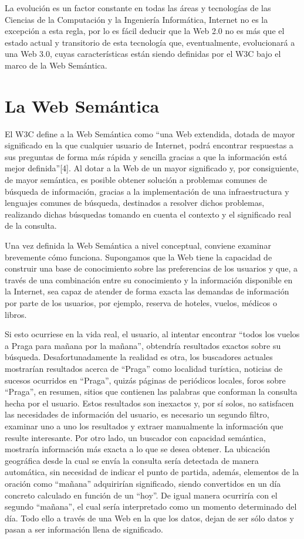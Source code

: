 La evolución es un factor constante en todas las áreas y tecnologías de las Ciencias de la Computación y la Ingeniería Informática, Internet no es la excepción a esta regla, por lo es fácil deducir que la Web 2.0 no es más que el estado actual y transitorio de esta tecnología que, eventualmente, evolucionará a una Web 3.0, cuyas características están siendo definidas por el W3C bajo el marco de la Web Semántica.

\section{La Web Semántica}

El W3C define a la Web Semántica como ``una Web extendida, dotada de mayor significado en la que cualquier usuario de Internet, podrá encontrar respuestas a sus preguntas de forma más rápida y sencilla gracias a que la información está mejor definida''[4]. Al dotar a la Web de un mayor significado y, por consiguiente, de mayor semántica, es posible obtener solución a problemas comunes de búsqueda de información, gracias a la implementación de una infraestructura y lenguajes comunes de búsqueda, destinados a resolver dichos problemas, realizando dichas búsquedas tomando en cuenta el contexto y el significado real de la consulta.

Una vez definida la Web Semántica a nivel conceptual, conviene examinar brevemente cómo funciona. Supongamos que la Web tiene la capacidad de construir una base de conocimiento sobre las preferencias de los usuarios y que, a través de una combinación entre su conocimiento y la información disponible en la Internet, sea capaz de atender de forma exacta las demandas de información por parte de los usuarios, por ejemplo, reserva de hoteles, vuelos, médicos o libros.

Si esto ocurriese en la vida real, el usuario, al intentar encontrar ``todos los vuelos a Praga para mañana por la mañana'', obtendría resultados exactos sobre su búsqueda. Desafortunadamente la realidad es otra, los buscadores actuales mostrarían resultados acerca de ``Praga'' como localidad turística, noticias de sucesos ocurridos en ``Praga'', quizás páginas de periódicos locales, foros sobre ``Praga'', en resumen, sitios que contienen las palabras que conforman la consulta hecha por el usuario. Estos resultados son inexactos y, por sí solos, no satisfacen las necesidades de información del usuario, es necesario un segundo filtro, examinar uno a uno los resultados y extraer manualmente la información que resulte interesante. Por otro lado, un buscador con capacidad semántica, mostraría información más exacta a lo que se desea obtener. La ubicación geográfica desde la cual se envía la consulta sería detectada de manera automática, sin necesidad de indicar el punto de partida, además, elementos de la oración como ``mañana'' adquirirían significado, siendo convertidos en un día concreto calculado en función de un ``hoy''. De igual manera ocurriría con el segundo ``mañana'', el cual sería interpretado como un momento determinado del día. Todo ello a través de una Web en la que los datos, dejan de ser sólo datos y pasan a ser información llena de significado.

